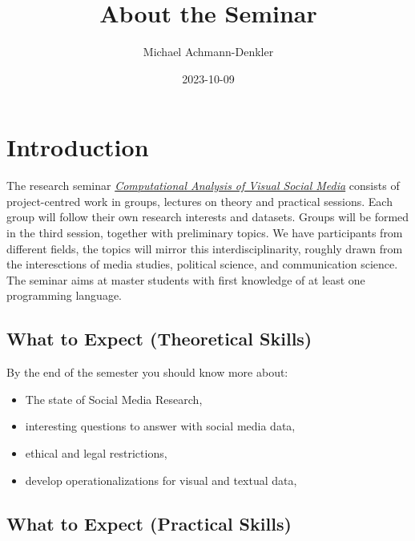 \documentclass[
  letterpaper,
  DIV=11,
  numbers=noendperiod]{scrartcl}
\title{About the Seminar}
\author{Michael Achmann-Denkler}
\date{2023-10-09}
\providecommand{\tightlist}{%
  \setlength{\itemsep}{0pt}\setlength{\parskip}{0pt}}\usepackage{longtable,booktabs,array}
\begin{document}
\maketitle
\ifdefined\Shaded\renewenvironment{Shaded}{\begin{tcolorbox}[sharp corners, interior hidden, borderline west={3pt}{0pt}{shadecolor}, boxrule=0pt, enhanced, breakable, frame hidden]}{\end{tcolorbox}}\fi

\hypertarget{introduction}{%
\section{Introduction}\label{introduction}}

The research seminar
\href{https://campusportal.uni-regensburg.de:443/qisserver/pages/startFlow.xhtml?_flowId=detailView-flow\&unitId=46591\&periodId=361}{\emph{Computational
Analysis of Visual Social Media}} consists of project-centred work in
groups, lectures on theory and practical sessions. Each group will
follow their own research interests and datasets. Groups will be formed
in the third session, together with preliminary topics. We have
participants from different fields, the topics will mirror this
interdisciplinarity, roughly drawn from the interesctions of media
studies, political science, and communication science. The seminar aims
at master students with first knowledge of at least one programming
language.

\hypertarget{what-to-expect-theoretical-skills}{%
\subsection{What to Expect (Theoretical
Skills)}\label{what-to-expect-theoretical-skills}}

By the end of the semester you should know more about:

\begin{itemize}
\tightlist
\item
  The state of Social Media Research,
\item
  interesting questions to answer with social media data,
\item
  ethical and legal restrictions,
\item
  develop operationalizations for visual and textual data,
\end{itemize}

\hypertarget{what-to-expect-practical-skills}{%
\subsection{What to Expect (Practical
Skills)}\label{what-to-expect-practical-skills}}
\end{document}
